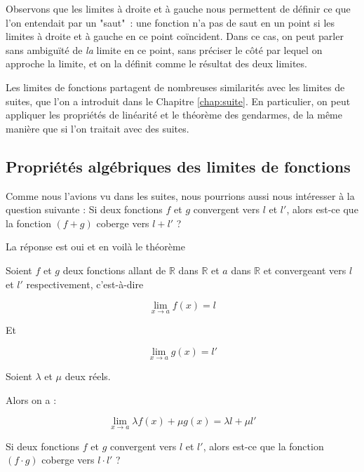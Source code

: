 Observons que les limites à droite et à gauche nous permettent de définir ce que l'on entendait par un "saut"~: une fonction n'a pas de saut en un point si les limites à droite et à gauche en ce point coïncident. Dans ce cas, on peut parler sans ambiguïté de \emph{la} limite en ce point, sans préciser le côté par lequel on approche la limite, et on la définit comme le résultat des deux limites.

Les limites de fonctions partagent de nombreuses similarités avec les limites de suites, que l'on a introduit dans le Chapitre \ref{chap:suite}. En particulier, on peut appliquer les propriétés de linéarité et le théorème des gendarmes, de la même manière que si l'on traitait avec des suites.


\subsection{Propriétés algébriques des limites de fonctions}
Comme nous l'avions vu dans les suites, nous pourrions aussi nous intéresser à la question suivante  : Si deux fonctions $f$ et $g$ convergent vers $l$ et $l'$, alors est-ce que la fonction $(f+g)$ coberge vers $l+l'$ ?


La réponse est oui et en voilà le théorème 


\begin{boxthm}
Soient $f$ et $g$ deux fonctions allant de $\mathbb{R}$ dans $\mathbb{R}$ et $a$ dans $\mathbb{R}$ et convergeant vers $l$ et $l'$ respectivement, c'est-à-dire 

$$\lim\limits_{x \rightarrow a } f(x) = l$$


Et 


$$\lim\limits_{x \rightarrow a } g(x) = l'$$


Soient $\lambda$ et $\mu $ deux réels.

Alors on a :

$$\lim\limits_{x \rightarrow a} \lambda f(x) + \mu g(x) = \lambda l + \mu l'$$
\end{boxthm}
    

 Si deux fonctions $f$ et $g$ convergent vers $l$ et $l'$, alors est-ce que la fonction $(f\cdot g)$ coberge vers $l \cdot l'$ ?


